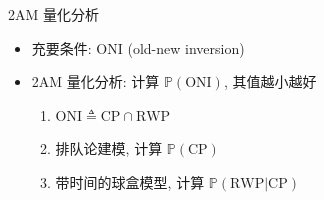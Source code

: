 \begin{frame}{2AM 量化分析}
  \vspace{0.30cm}

  \begin{itemize}
    \setlength{\itemsep}{8pt}
    \item 充要条件: ONI (old-new inversion)
    \item 2AM 量化分析: 计算 $\mathbb{P}(\textrm{ONI})$, 其值越小越好
      \begin{enumerate}
        \setlength{\itemsep}{3pt}
        \item $\textrm{ONI} \triangleq \textrm{CP} \cap \textrm{RWP}$
        \item 排队论建模, 计算 $\mathbb{P}(\textrm{CP})$ \item 带时间的球盒模型, 计算 
          $\mathbb{P}(\textrm{RWP|CP})$
      \end{enumerate}
  \end{itemize}
\end{frame}



